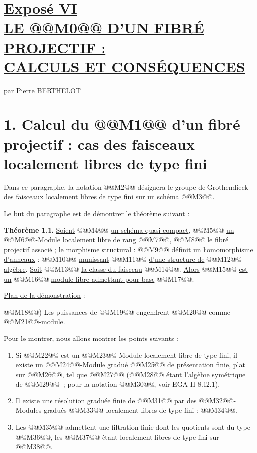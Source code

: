 
\section*{\underline{Exposé VI}\\[3pt] \underline{\underline{LE @@M0@@ D'UN FIBRÉ PROJECTIF :}}\\[3pt] \underline{\underline{CALCULS ET CONSÉQUENCES}}}
\renewcommand{\Sym}{\mathbf{S}}
\renewcommand{\Projz}{\underline{\operatorname{Proj}}_0}
\begin{center}
\underline{par Pierre BERTHELOT}
\end{center}

\section*{1. Calcul du @@M1@@ d'un fibré projectif : cas des faisceaux localement libres de type fini}

Dans ce paragraphe, la notation @@M2@@ désignera le groupe de Grothendieck des faisceaux localement libres de type fini sur un schéma @@M3@@.

Le but du paragraphe est de démontrer le théorème suivant :

\textbf{Théorème 1.1.} \uline{Soient} @@M4@@ \uline{un schéma quasi-compact}, @@M5@@ \uline{un} @@M6@@\uline{-Module localement libre de rang} @@M7@@, @@M8@@ \uline{le fibré projectif associé} ; \uline{le morphisme structural} : @@M9@@ \uline{définit un homomorphisme d'anneaux} : @@M10@@ \uline{munissant} @@M11@@ \uline{d'une structure de} @@M12@@-\uline{algèbre}. \uline{Soit} @@M13@@ \uline{la classe du faisceau} @@M14@@. \uline{Alors} @@M15@@ \uline{est un} @@M16@@-\uline{module libre admettant pour base} @@M17@@.

\uline{Plan de la démonstration} :

@@M18@@) Les puissances de @@M19@@ engendrent @@M20@@ comme @@M21@@-module.

Pour le montrer, nous allons montrer les points suivants :

\begin{enumerate}[label=\alph*)]
\item Si @@M22@@ est un @@M23@@-Module localement libre de type fini, il existe un @@M24@@-Module gradué @@M25@@ de présentation finie, plat sur @@M26@@, tel que @@M27@@ (@@M28@@ étant l'algèbre symétrique de @@M29@@~; pour la notation @@M30@@, voir EGA II 8.12.1).

\item Il existe une résolution graduée finie de @@M31@@ par des @@M32@@-Modules gradués @@M33@@ localement libres de type fini : @@M34@@.

\item Les @@M35@@ admettent une filtration finie dont les quotients sont du type @@M36@@, les @@M37@@ étant localement libres de type fini sur @@M38@@.
\end{enumerate}

